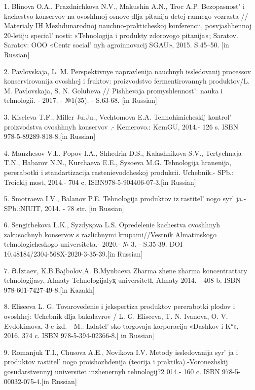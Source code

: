 \begin{references}
1. Blinova O.A., Prazdnichkova N.V., Makushin A.N., Troc A.P.
Bezopasnost'{} i kachestvo konservov na ovoshhnoj osnove
dlja pitanija detej rannego vozrasta // Materialy IH Mezhdunarodnoj
nauchno-praktiche\-skoj konferencii, posvjashhennoj 20-letiju
special' nosti: «Tehnologija i produkty zdorovogo
pitanija»; Saratov. Saratov: OOO «Centr social' nyh
agroinnovacij SGAU», 2015. S.45--50. {[}in Russian{]}

2. Pavlovskaja, L. M. Perspektivnye napravlenija nauchnyh issledovanij
processov konservirovanija ovosh\-hej i fruktov: proizvodstvo
fermentirovannyh produktov/L. M. Pavlovskaja, S. N. Golubeva //
Pishhevaja promyshlennost': nauka i tehnologii. - 2017. -
№1(35). - S.63-68. {[}in Russian{]}

3. Kiseleva T.F., Miller Ju.Ju., Vechtomova E.A. Tehnohimicheskij
kontrol'{} proizvodstva ovoshhnyh kon\-servov .- Kemerovo.:
KemGU, 2014.- 126 s. ISBN 978-5-89289-818-8.{[}in Russian{]}

4. Manzhesov V.I., Popov I.A., Shhedrin D.S., Kalashnikova S.V.,
Tertychnaja T.N., Habarov N.N., Kur\-chaeva E.E., Sysoeva M.G. Tehnologija
hranenija, pererabotki i standartizacija rastenievodcheskoj produk\-cii.
Uchebnik.- SPb.: Troickij most, 2014.- 704 c.
ISBN978-5-904406-07-3.{[}in Russian{]}

5. Smotraeva I.V., Balanov P.E. Tehnologija produktov iz
rastitel' nogo syr' ja.- SPb.:NIUIT,
2014. - 78 str. {[}in Russian{]}

6. Sengirbekova L.K., Syzdyқova L.S. Opredelenie kachestva ovoshhnyh
zakusochnyh konservov s razlich\-nymi krupami//Vestnik Almatinskogo
tehnologicheskogo universiteta.- 2020.- № 3. - S.35-39. DOI\\
10.48184/2304-568X-2020-3-35-39.{[}in Russian{]}

7. Ә.Іztaev, K.B.Bajbolov,A. B.Mynbaeva Zharma zhәne zharma
koncentrattary tehnologijasy, Almaty Tehnologijalyқ universitetі, Almaty
2014. - 408 b. ISBN 978-601-7427-49-8.{[}in Kazakh{]}

8. Eliseeva L. G. Tovarovedenie i jekspertiza produktov pererabotki
plodov i ovoshhej: Uchebnik dlja bakalavrov / L. G. Eliseeva, T. N.
Ivanova, O. V. Evdokimova.-3-e izd. - M.:
Izdatel' sko-torgovaja korpora\-cija «Dashkov i K°», 2016.
374 c. ISBN 978-5-394-02366-8.{[} in Russian{]}

9. Romanjuk T.I., Chusova A.E., Novikova I.V. Metody issledovanija
syr' ja i produktov rastitel' nogo
proishozhdenija (teorija i praktika).-Voronezhskij gosudarstvennyj
universitet inzhenernyh tehnologij?2 014.- 160 c. ISBN
978-5-00032-075-4.{[}in Russian{]}


\end{references}
